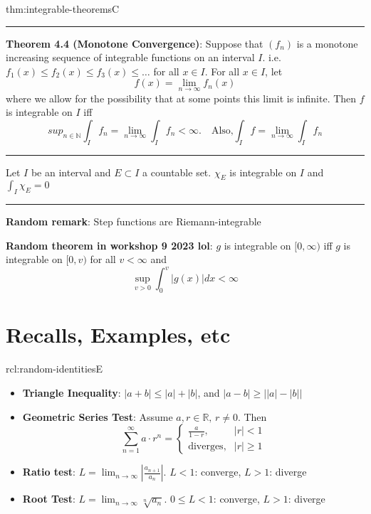 \documentclass[landscape, 8pt]{extarticle}
\begin{document}
\begin{multicols}{3}
\begin{thm}{thm:integrable-theorems}{C}
	\vspace{-5pt}
	\noindent\rule{\textwidth}{0.2pt}

	\textbf{Theorem 4.4 (Monotone Convergence)}: Suppose that $(f_{n})$ is a monotone increasing sequence of integrable functions on an interval $I$. i.e. $f_{1}(x) \le f_{2}(x) \le f_{3}(x) \le \dots$ for all $x\in I$. For all $x\in I$, let
	\[f(x) = \lim_{n\to \infty} f_{n}(x)\]
	where we allow for the possibility that at some points this limit is infinite. Then $f$ is integrable on $I$ iff
	\[sup_{n\in \mathbb{N}} \int_{I} f_{n} = \lim_{n\to \infty} \int_{I} f_{n} < \infty. \quad \text{Also,} \int_{I} f = \lim_{n\to \infty} \int_{I} f_{n}\]

	\noindent\rule{\textwidth}{0.2pt}

	Let $I$ be an interval and $E \subset I$ a countable set. $\chi_{E}$ is integrable on $I$ and $\int_{I}\chi_{E} = 0$

	\noindent\rule{\textwidth}{0.2pt}
	\textbf{Random remark}: Step functions are Riemann-integrable

	\textbf{Random theorem in workshop 9 2023 lol}: $g$ is integrable on $[0, \infty)$ iff $g$ is integrable on $[0, v)$ for all $v < \infty$ and
	\[\sup_{v > 0} \int_{0}^{v} \lvert g(x) \rvert dx < \infty\]
\end{thm}

\newpage

\section{Recalls, Examples, etc}

\begin{rcl}{rcl:random-identities}{E}
	\begin{itemize}[leftmargin=*]
	    \setlength\itemsep{0em}
	    \item \textbf{Triangle Inequality}: $\lvert a + b \rvert \le \lvert a \rvert + \lvert b \rvert$, and $\lvert a - b \rvert \ge \lvert \lvert a \rvert - \lvert b \rvert \rvert$
	    \item \textbf{Geometric Series Test}: Assume $a, r\in \mathbb{R},\, r\ne 0$. Then
			\[\sum_{n = 1}^{\infty}a \cdot r^{n} = \begin{cases}
				\displaystyle\frac{a}{1 - r}, & \lvert r \rvert < 1 \\
				\text{diverges}, & \lvert r \rvert \ge 1
			\end{cases}\]
		\item \textbf{Ratio test}: $\displaystyle L = \lim_{n\to\infty} \left\lvert \frac{a_{n+1}}{a_{n}} \right\rvert$. $L<1$: converge,  $L>1$: diverge
		\item \textbf{Root Test}: $\displaystyle L = \lim_{n\to \infty} \sqrt[n]{a_{n}}$. $0 \le L < 1$: converge, $L>1$: diverge
		

\end{itemize}
\end{rcl}
\end{multicols}
\end{document}
